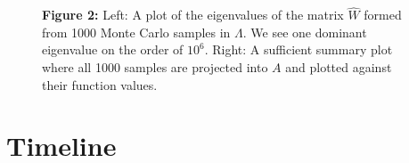 \documentclass{amsart}
\begin{document}
\begin{figure}
\textbf{Figure 2:} Left: A plot of the eigenvalues of the matrix $\hat{W}$ formed from 1000 Monte Carlo samples in $\Lambda$. We see one dominant eigenvalue on the order of $10^6$. Right: A sufficient summary plot where all 1000 samples are projected into $A$ and plotted against their function values.
\end{figure} 






\section{Timeline}










\end{document}
